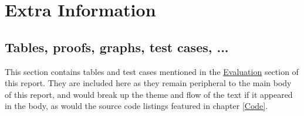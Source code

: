 \chapter{Extra Information} \label{Appendix}
\section{Tables, proofs, graphs, test cases, ...}

This section contains tables and test cases mentioned in the \hyperref[Evaluation]{Evaluation} section of this report. They are included here as they remain peripheral to the main body of this report, and would break up the theme and flow of the text if it appeared in the body, as would the source code listings featured in chapter \ref{Code}.

